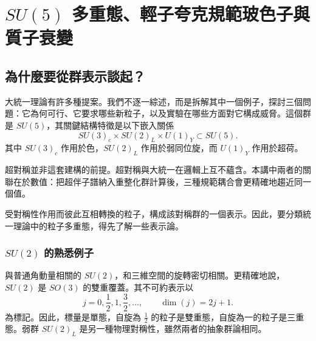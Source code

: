 \chapter{\texorpdfstring{\(SU(5)\)}{SU(5)} 多重態、輕子夸克規範玻色子與質子衰變}


\section{為什麼要從群表示談起？}

大統一理論有許多種提案。我們不逐一綜述，而是拆解其中一個例子，探討三個問題：它為何可行、它要求哪些新粒子，以及實驗在哪些方面對它構成威脅。這個群是 \(SU(5)\)，其關鍵結構特徵是以下嵌入關係
\begin{equation}
SU(3)_c\times SU(2)_L\times U(1)_Y
\subset SU(5).
\label{eq:l10-sm-embedding}
\end{equation}
其中 \(SU(3)_c\) 作用於色，\(SU(2)_L\) 作用於弱同位旋，而 \(U(1)_Y\) 作用於超荷。

超對稱並非這套建構的前提。超對稱與大統一在邏輯上互不蘊含。本講中兩者的關聯在於數值：把超伴子譜納入重整化群計算後，三種規範耦合會更精確地趨近同一個值。

受對稱性作用而彼此互相轉換的粒子，構成該對稱群的一個表示。因此，要分類統一理論中的粒子多重態，得先了解一些表示論。

\subsection{\texorpdfstring{\(SU(2)\)}{SU(2)} 的熟悉例子}

與普通角動量相關的 \(SU(2)\)，和三維空間的旋轉密切相關。更精確地說，\(SU(2)\) 是 \(SO(3)\) 的雙重覆蓋。其不可約表示以
\begin{equation}
j=0,\frac12,1,\frac32,\ldots,
\qquad
\dim(j)=2j+1.
\label{eq:l10-su2-spins}
\end{equation}
為標記。因此，標量是單態，自旋為 \(\tfrac12\) 的粒子是雙重態，自旋為一的粒子是三重態。弱群 \(SU(2)_L\) 是另一種物理對稱性，雖然兩者的抽象群論相同。

